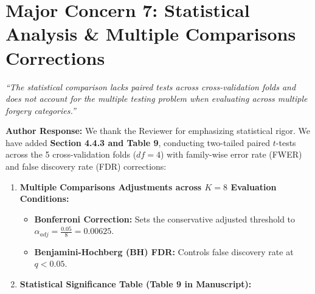 \documentclass[runningheads]{llncs}
\begin{document}
\section*{Major Concern 7: Statistical Analysis \& Multiple Comparisons Corrections}

\begin{tcolorbox}[colback=gray!10,colframe=gray!50,title=\textbf{Reviewer Comment 7}]
\textit{``The statistical comparison lacks paired tests across cross-validation folds and does not account for the multiple testing problem when evaluating across multiple forgery categories.''}
\end{tcolorbox}

\noindent\textbf{Author Response:} We thank the Reviewer for emphasizing statistical rigor. We have added \textbf{Section 4.4.3 and Table 9}, conducting two-tailed paired $t$-tests across the 5 cross-validation folds ($df = 4$) with family-wise error rate (FWER) and false discovery rate (FDR) corrections:

\begin{enumerate}
    \item \textbf{Multiple Comparisons Adjustments across $K=8$ Evaluation Conditions:}
    \begin{itemize}
        \item \textbf{Bonferroni Correction:} Sets the conservative adjusted threshold to $\alpha_{adj} = \frac{0.05}{8} = 0.00625$.
        \item \textbf{Benjamini-Hochberg (BH) FDR:} Controls false discovery rate at $q < 0.05$.
    \end{itemize}

    \item \textbf{Statistical Significance Table (Table 9 in Manuscript):}
\end{enumerate}
\end{document}
